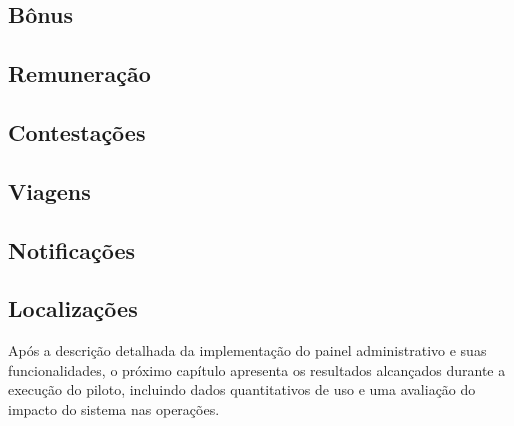 \subsection{Bônus}



\subsection{Remuneração}



\subsection{Contestações}



\subsection{Viagens}


\subsection{Notificações}


\subsection{Localizações}


Após a descrição detalhada da implementação do painel administrativo e suas funcionalidades, o próximo capítulo apresenta os resultados alcançados durante a execução do piloto, incluindo dados quantitativos de uso e uma avaliação do impacto do sistema nas operações.

